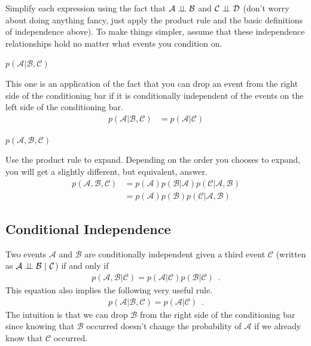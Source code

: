 \documentclass[review_Solutions]{subfiles}
\begin{document}
\begin{exercise}
Simplify each expression using the fact that $\mathcal{A} \perp\!\!\!\perp \mathcal{B}$ and $\mathcal{C} \perp\!\!\!\perp \mathcal{D}$ (don't worry about doing anything fancy, just apply the product rule and the basic definitions of independence above).  To make things simpler, assume that these independence relationships hold no matter what events you condition on.
\bes
\item $p(\mathcal{A} | \mathcal{B}, \mathcal{C})$
\begin{boxedsolution}
This one is an application of the fact that you can drop an event from the right side of the conditioning bar if it is conditionally independent of the events on the left side of the conditioning bar.
\begin{align}
p(\mathcal{A} | \mathcal{B}, \mathcal{C}) &= p(\mathcal{A} | \mathcal{C})
\end{align}
\end{boxedsolution}
\item $p(\mathcal{A}, \mathcal{B}, \mathcal{C})$
\begin{boxedsolution}
Use the product rule to expand.  Depending on the order you chooses to expand, you will get a slightly different, but equivalent, answer.
\begin{align}
p(\mathcal{A}, \mathcal{B}, \mathcal{C}) &= p(\mathcal{A}) p(\mathcal{B}| \mathcal{A}) p(\mathcal{C} | \mathcal{A}, \mathcal{B}) \nonumber \\
&= p(\mathcal{A}) p(\mathcal{B}) p(\mathcal{C} | \mathcal{A}, \mathcal{B}) \nonumber
\end{align}
\end{boxedsolution}
\ees
\end{exercise}

\subsection{Conditional Independence}


Two events $\mathcal{A}$ and $\mathcal{B}$ are conditionally independent given a third event $\mathcal{C}$ (written as $\mathcal{A} \perp\!\!\!\perp \mathcal{B}~|~\mathcal{C}$) if and only if
\begin{align}
p(\mathcal{A}, \mathcal{B} | \mathcal{C}) = p(\mathcal{A} | \mathcal{C}) p(\mathcal{B} | \mathcal{C}) \enspace .
\end{align}
This equation also implies the following very useful rule.
\begin{align}
p(\mathcal{A} | \mathcal{B}, \mathcal{C}) = p(\mathcal{A} | \mathcal{C}) \enspace .
\end{align}
The intuition is that we can drop $\mathcal{B}$ from the right side of the conditioning bar since knowing that $\mathcal{B}$ occurred doesn't change the probability of $\mathcal{A}$ if we already know that $\mathcal{C}$ occurred.
\end{document}
